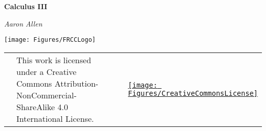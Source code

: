 
    \begin{titlepage}
    \centering 
    \vspace*{.5in}
    {\Huge \bf Calculus III\par}
    \vspace{1.5cm}
    {\Large\itshape Aaron Allen \par}


    \vfill
    \texttt{[image: Figures/FRCCLogo]}\par\vspace{1cm}
    
 \vfill
 
 \begin{tabular}{c p{0.6\linewidth}c p{0.4\linewidth}} \hspace*{.5in}
 & \vspace*{.01in} This work is licensed under a Creative Commons Attribution-NonCommercial-ShareAlike 4.0 International License. &\hspace*{.1in} & \vspace*{.01in} \href{https://creativecommons.org/licenses/by-nc-sa/4.0/}{\texttt{[image: Figures/CreativeCommonsLicense]}}
 \end{tabular}
 
    \end{titlepage}